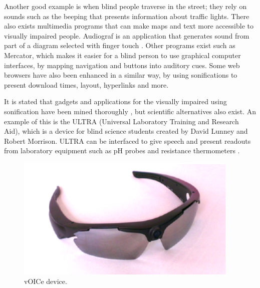 Another good example is when blind people traverse in the street; they rely on sounds such as the beeping that presents information about traffic lights. 
There also exists multimedia programs that can make maps and text more accessible to visually impaired people. 
Audiograf is an application that generates sound from part of a diagram selected with finger touch \cite*{Barrass1999}. 
Other programs exist such as Mercator, which makes it easier for a blind person to use graphical computer interfaces, by mapping navigation and buttons into auditory cues. Some web browsers have also been enhanced in a similar way, by using sonifications to present download times, layout, hyperlinks and more\cite*{Barrass1999}.


It is stated that gadgets and applications for the visually impaired using sonification have been mined thoroughly \cite*{Girvin2005}, but scientific alternatives also exist. An example of this is the ULTRA (Universal Laboratory Training and Research Aid), which is a device for blind science students created by David Lunney and Robert Morrison. 
ULTRA can be interfaced to give speech and present readouts from laboratory equipment such as pH probes and resistance thermometers \cite*{Girvin2005}.

\begin{figure}[!htbp]
    \centering
    \includegraphics[width=0.95\textwidth]{images/Sonification1.png}
    \caption{vOICe device.}
    \label{fig:sonification1}
\end{figure}

